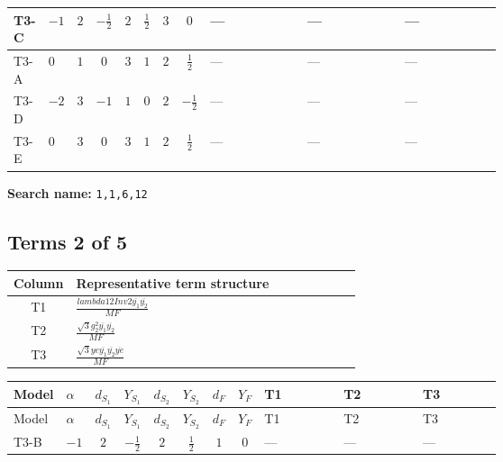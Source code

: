 \documentclass[8pt]{article}
\begin{document}
\begin{landscape}
\begin{longtable}{@{}llcccccc >{\raggedright\arraybackslash}p{0.21\linewidth} >{\raggedright\arraybackslash}p{0.21\linewidth} >{\raggedright\arraybackslash}p{0.21\linewidth}@{}}
\midrule
T3-C & $-1$ & $2$ & $-\frac{1}{2}$ & $2$ & $\frac{1}{2}$ & $3$ & $0$ & --- & --- & --- \\
\midrule
T3-A & $0$ & $1$ & $0$ & $3$ & $1$ & $2$ & $\frac{1}{2}$ & --- & --- & --- \\
\midrule
T3-D & $-2$ & $3$ & $-1$ & $1$ & $0$ & $2$ & $-\frac{1}{2}$ & --- & --- & --- \\
\midrule
T3-E & $0$ & $3$ & $0$ & $3$ & $1$ & $2$ & $\frac{1}{2}$ & --- & --- & --- \\
\midrule
\bottomrule
\end{longtable}
\clearpage
\noindent\textbf{Search name: }\texttt{1,1,6,12}\par\smallskip
\subsection*{Terms 2 of 5}
\begin{center}
\begin{tabular}{@{}c >{\raggedright\arraybackslash}p{0.82\linewidth}@{}}
\toprule
Column & Representative term structure \\
\midrule
T1 & \(\displaystyle \frac{lambda12Inv2 \overline{y_{1}} \overline{y_{2}}}{MF}\) \\
\midrule
T2 & \(\displaystyle \frac{\sqrt{3} g_{2}^{2} \overline{y_{1}} \overline{y_{2}}}{MF}\) \\
\midrule
T3 & \(\displaystyle \frac{\sqrt{3} ye \overline{y_{1}} \overline{y_{2}} \overline{ye}}{MF}\) \\
\midrule
\bottomrule
\end{tabular}
\end{center}
\smallskip
\tiny
\begin{longtable}{@{}llcccccc >{\raggedright\arraybackslash}p{0.21\linewidth} >{\raggedright\arraybackslash}p{0.21\linewidth} >{\raggedright\arraybackslash}p{0.21\linewidth}@{}}
\toprule
Model & $\alpha$ & $d_{S_1}$ & $Y_{S_1}$ & $d_{S_2}$ & $Y_{S_2}$ & $d_F$ & $Y_F$ & T1 & T2 & T3 \\
\midrule
\endfirsthead
\toprule
Model & $\alpha$ & $d_{S_1}$ & $Y_{S_1}$ & $d_{S_2}$ & $Y_{S_2}$ & $d_F$ & $Y_F$ & T1 & T2 & T3 \\
\midrule
\endhead
T3-B & $-1$ & $2$ & $-\frac{1}{2}$ & $2$ & $\frac{1}{2}$ & $1$ & $0$ & --- & --- & --- \\
\midrule

\end{longtable}
\end{landscape}
\end{document}
